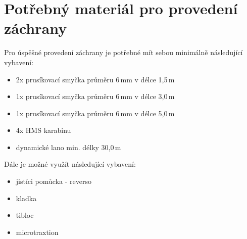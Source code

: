 \chapter{Potřebný materiál pro provedení záchrany}
\label{Potrebny_material}
\def\figurename{Obr.} %
\def\tablename{Tab.} %
\def\figureautorefname{obr.} %
\def\tableautorefname{tab.} %
\def\chapterautorefname{kapitola} %

Pro úspěšné provedení záchrany je potřebné mít sebou minimálně následující vybavení: 

\begin{itemize}
    \item 2x prusíkovací smyčka průměru 6\,mm v délce 1,5\,m
    \item 1x prusíkovací smyčka průměru 6\,mm v délce 3,0\,m
    \item 1x prusíkovací smyčka průměru 6\,mm v délce 5,0\,m
    \item 4x HMS karabinu
    \item dynamické lano min. délky 30,0\,m
\end{itemize}

\noindent Dále je možné využít následující vybavení: 

\begin{itemize}
    \item jistíci pomůcka - reverso
    \item kladka
    \item tibloc
    \item microtraxtion
\end{itemize}

